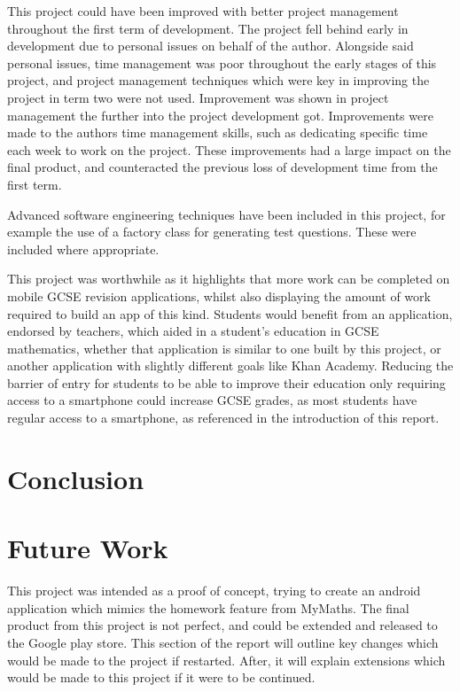 \documentclass{article}
\begin{document}
This project could have been improved with better project management throughout the first term of development. The project fell behind early in development due to personal issues on behalf of the author. Alongside said personal issues, time management was poor throughout the early stages of this project, and project management techniques which were key in improving the project in term two were not used. Improvement was shown in project management the further into the project development got. Improvements were made to the authors time management skills, such as dedicating specific time each week to work on the project. These improvements had a large impact on the final product, and counteracted the previous loss of development time from the first term. \par

Advanced software engineering techniques have been included in this project, for example the use of a factory class for generating test questions. These were included where appropriate. \par

This project was worthwhile as it highlights that more work can be completed on mobile GCSE revision applications, whilst also displaying the amount of work required to build an app of this kind. Students would benefit from an application, endorsed by teachers, which aided in a student's education in GCSE mathematics, whether that application is similar to one built by this project, or another application with slightly different goals like Khan Academy. Reducing the barrier of entry for students to be able to improve their education only requiring access to a smartphone could increase GCSE grades, as most students have regular access to a smartphone, as referenced in the introduction of this report. \par

\section{Conclusion}
\label{section:conclusion}

\section{Future Work}
\label{section:futureWork}

This project was intended as a proof of concept, trying to create an android application which mimics the homework feature from MyMaths. The final product from this project is not perfect, and could be extended and released to the Google play store. This section of the report will outline key changes which would be made to the project if restarted. After, it will explain extensions which would be made to this project if it were to be continued. \par
\end{document}
